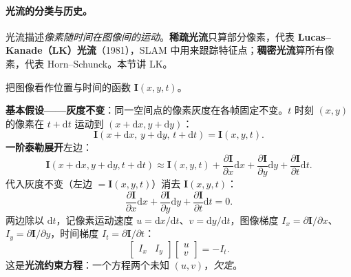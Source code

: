 \paragraph{光流的分类与历史\cite{gaoxiang2019slam14}。}光流描述\emph{像素随时间在图像间的运动}。\textbf{稀疏光流}只算部分像素，代表 \textbf{Lucas--Kanade（LK）光流}（1981），SLAM 中用来跟踪特征点；\textbf{稠密光流}算所有像素，代表 Horn--Schunck。本节讲 LK。

\begin{derivation}
\label{thm:vo-lk}
把图像看作位置与时间的函数 $\mathbf{I}(x,y,t)$\cite{gaoxiang2019slam14}。

\textbf{基本假设——灰度不变}：同一空间点的像素灰度在各帧固定不变。$t$ 时刻 $(x,y)$ 的像素在 $t+\mathrm{d}t$ 运动到 $(x+\mathrm{d}x,y+\mathrm{d}y)$：
\begin{equation}
  \mathbf{I}(x+\mathrm{d}x,\,y+\mathrm{d}y,\,t+\mathrm{d}t)=\mathbf{I}(x,y,t).
  \label{eq:vo-lk-const}
\end{equation}
\textbf{一阶泰勒展开}左边：
\begin{equation}
  \mathbf{I}(x+\mathrm{d}x,y+\mathrm{d}y,t+\mathrm{d}t)\approx\mathbf{I}(x,y,t)+\frac{\partial\mathbf{I}}{\partial x}\mathrm{d}x+\frac{\partial\mathbf{I}}{\partial y}\mathrm{d}y+\frac{\partial\mathbf{I}}{\partial t}\mathrm{d}t.
  \label{eq:vo-lk-taylor}
\end{equation}
代入灰度不变（左边 $=\mathbf{I}(x,y,t)$）消去 $\mathbf{I}(x,y,t)$：
\begin{equation}
  \frac{\partial\mathbf{I}}{\partial x}\mathrm{d}x+\frac{\partial\mathbf{I}}{\partial y}\mathrm{d}y+\frac{\partial\mathbf{I}}{\partial t}\mathrm{d}t=0.
  \label{eq:vo-lk-diff}
\end{equation}
两边除以 $\mathrm{d}t$，记像素运动速度 $u=\mathrm{d}x/\mathrm{d}t$、$v=\mathrm{d}y/\mathrm{d}t$，图像梯度 $I_x=\partial\mathbf{I}/\partial x$、$I_y=\partial\mathbf{I}/\partial y$，时间梯度 $I_t=\partial\mathbf{I}/\partial t$：
\begin{equation}
  \begin{bmatrix}I_x & I_y\end{bmatrix}\begin{bmatrix}u\\v\end{bmatrix}=-I_t.
  \label{eq:vo-lk-flow}
\end{equation}
这是\textbf{光流约束方程}：一个方程两个未知 $(u,v)$，\emph{欠定}。
\end{derivation}


